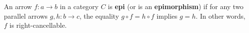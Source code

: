 An arrow $f: a \rightarrow b$ in a category $C$ is \textbf{epi} (or is an \textbf{epimorphism}) if for any two parallel arrows $g, h: b \rightarrow c$, the equality $g \circ f = h \circ f$ implies $g = h$. In other words, $f$ is right-cancellable.